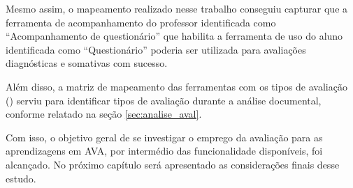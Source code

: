 Mesmo assim, o mapeamento realizado nesse trabalho conseguiu capturar que a ferramenta de acompanhamento do professor identificada como ``Acompanhamento de questionário'' que habilita a ferramenta de uso do aluno identificada como ``Questionário'' poderia ser utilizada para avaliações diagnósticas e somativas com sucesso.

Além disso, a matriz de mapeamento das ferramentas com os tipos de avaliação () serviu para identificar tipos de avaliação durante a análise documental, conforme relatado na seção \ref{sec:analise_aval}.

Com isso, o objetivo geral de se investigar o emprego da avaliação para as aprendizagens em AVA, por intermédio das funcionalidade disponíveis, foi alcançado. No próximo capítulo será apresentado as considerações finais desse estudo.

